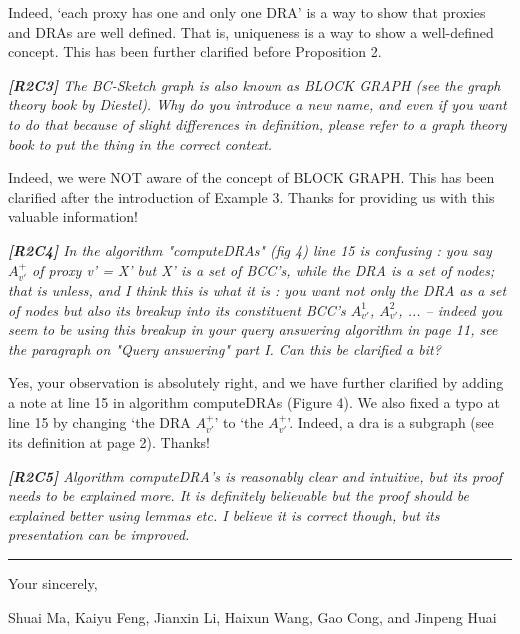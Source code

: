 \documentclass[11pt]{letter}
\newcommand{\vs}{\vspace{1ex}}
\newcommand{\svs}{\vspace{0.36ex}}
\newcommand{\dra}{{\sc dra}\xspace}
\begin{document}
Indeed, `each proxy has one and only one DRA' is a way to show that proxies and DRAs are well defined. That is, uniqueness is a way to show a well-defined concept. This has been further clarified before Proposition 2.

\vs
\noindent
{\em
{\bf [R2C3]} The BC-Sketch graph is also known as BLOCK GRAPH (see the graph theory book by Diestel). Why do you introduce a new name, and even if you want to do that because of slight differences in definition, please refer to a graph theory book to put the thing in the correct context.}
\svs

Indeed, we were NOT aware of the concept of BLOCK GRAPH. This has been clarified after the introduction of Example 3. Thanks for providing us with this valuable information!


\vs
\noindent
{\em{\bf[R2C4]}  In the algorithm "computeDRAs" (fig 4) line 15 is confusing : you say $A^+_{v'}$ of proxy v' = X' but X' is a set of BCC's, while the DRA is a set of nodes; that is unless, and I think this is what it is : you want not only the DRA as a set of nodes but also its breakup into its constituent BCC's $A^1_{v'}$, $A^2_{v'}$, ... -- indeed you seem to be using this breakup in your query answering algorithm in page 11, see the paragraph on "Query answering" part I. Can this be clarified a bit?}
\svs

Yes, your observation is absolutely right, and we have further clarified by adding a note at line 15 in algorithm computeDRAs (Figure 4). 
We also fixed a typo at line 15 by changing `the DRA $A^+_{v'}$' to `the $A^+_{v'}$'. Indeed, a \dra is a subgraph (see its definition at page 2). Thanks!


\vs
\noindent
{\em{\bf[R2C5]} Algorithm computeDRA's is reasonably clear and intuitive, but its proof needs to be explained more. It is definitely believable but the proof should be explained better using lemmas etc. I believe it is correct though, but its presentation can be improved.}
\svs



\vspace{3.6ex}
\hrule
\vspace{3.6ex}
\closing{Your sincerely,}

\vspace{-8ex}
Shuai Ma, Kaiyu Feng, Jianxin Li, Haixun Wang, Gao Cong, and Jinpeng Huai
\end{document}
